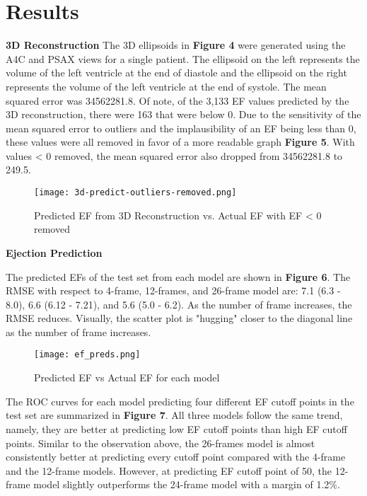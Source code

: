 \documentclass{article}
\begin{document}
\section{Results}\label{sec3}


\noindent\textbf{3D Reconstruction}
The 3D ellipsoids in \textbf{Figure 4} were generated using the A4C and PSAX views for a single patient. The ellipsoid on the left represents the volume of the left ventricle at the end of diastole and the ellipsoid on the right represents the volume of the left ventricle at the end of systole.  The mean squared error was 34562281.8.  Of note, of the 3,133 EF values predicted by the 3D reconstruction, there were 163 that were below 0. Due to the sensitivity of the mean squared error to outliers and the implausibility of an EF being less than 0, these values were all removed in favor of a more readable graph \textbf{Figure 5}. With values < 0 removed, the mean squared error also dropped from 34562281.8 to 249.5.

\begin{figure} [H]
  \centering
  \texttt{[image: 3d-predict-outliers-removed.png]}
  \caption{Predicted EF from 3D Reconstruction vs. Actual EF with EF < 0 removed}
\end{figure}

\noindent\textbf{Ejection Prediction}

The predicted EFs of the test set from each model are shown in \textbf{Figure 6}. The RMSE with respect to 4-frame, 12-frames, and 26-frame model are: 7.1 (6.3 - 8.0), 6.6 (6.12 - 7.21), and 5.6 (5.0 - 6.2). As the number of frame increases, the RMSE reduces. Visually, the scatter plot is "hugging" closer to the diagonal line as the number of frame increases.

\begin{figure} [H]
  \centering
\texttt{[image: ef\_preds.png]}
  \caption{Predicted EF vs Actual EF for each model}
\end{figure}

The ROC curves for each model predicting four different EF cutoff points in the test set are summarized in \textbf{Figure 7}. All three models follow the same trend, namely, they are better at predicting low EF cutoff points than high EF cutoff points. Similar to the observation above, the 26-frames model is almost consistently better at predicting every cutoff point compared with the 4-frame and the 12-frame models. However, at predicting EF cutoff point of 50, the 12-frame model slightly outperforms the 24-frame model with a margin of 1.2$\%$.
\end{document}
